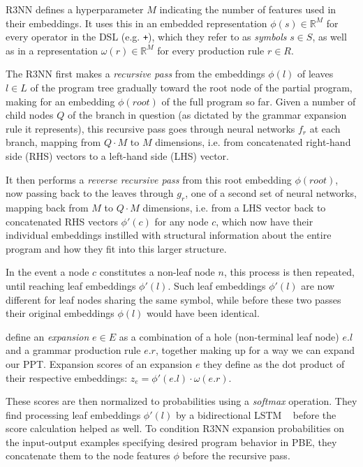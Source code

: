 \documentclass{article}
\begin{document}
R3NN defines a hyperparameter $M$ indicating the number of features used in their embeddings.
It uses this in an embedded representation $\phi(s) \in \mathbb{R}^M$
for every operator in the DSL (e.g. \verb|+|), which they refer to as \emph{symbols} $s \in S$,
as well as in a representation $\omega(r) \in \mathbb{R}^M$ for every production rule $r \in R$.

The R3NN first makes a \emph{recursive pass} from the embeddings $\phi(l)$
of leaves $l \in L$ of the program tree gradually toward the root node of the partial program,
making for an embedding $\phi(root)$ of the full program so far.
Given a number of child nodes $Q$ of the branch in question
(as dictated by the grammar expansion rule it represents),
this recursive pass goes through neural networks $f_r$ at each branch,
mapping from $Q \cdot M$ to $M$ dimensions,
i.e. from concatenated right-hand side (RHS) vectors to a left-hand side (LHS) vector.

It then performs a \emph{reverse recursive pass} from this root embedding $\phi(root)$,
now passing back to the leaves through $g_r$,
one of a second set of neural networks,
mapping back from $M$ to $Q \cdot M$ dimensions,
i.e. from a LHS vector back to concatenated RHS vectors $\phi'(c)$ for any node $c$,
which now have their individual embeddings instilled with structural information about the entire program and how they fit into this larger structure.

In the event a node $c$ constitutes a non-leaf node $n$,
this process is then repeated, until reaching leaf embeddings $\phi'(l)$.
Such leaf embeddings $\phi'(l)$ are now different for leaf nodes sharing the same symbol,
while before these two passes their original embeddings $\phi(l)$ would have been identical.

\citet{nsps} define an \emph{expansion} $e \in E$ as a combination of a hole (non-terminal leaf node) $e.l$ and a grammar production rule $e.r$, together making up for a way we can expand our PPT.
Expansion scores of an expansion $e$ they define as the dot product of their respective embeddings:
$z_e = \phi'(e.l) \cdot \omega(e.r)$.

These scores are then normalized to probabilities using a \emph{softmax} operation.
They find processing leaf embeddings $\phi'(l)$ by a bidirectional LSTM%
~\citep{huang2015bidirectional} before the score calculation helped as well.
To condition R3NN expansion probabilities on the input-output examples specifying desired program behavior in PBE,
they concatenate them to the node features $\phi$ before the recursive pass.
\end{document}
